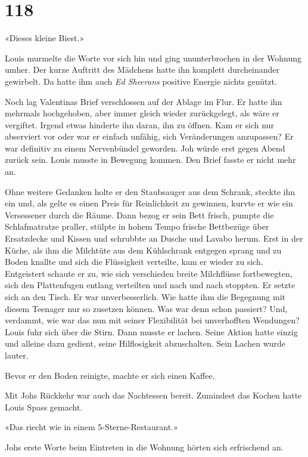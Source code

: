 \chapter{118}



«Dieses kleine Biest.»

Louis murmelte die Worte vor sich hin und ging ununterbrochen in der 
Wohnung umher. Der kurze Auftritt des Mädchens hatte ihn komplett
durcheinander gewirbelt. Da hatte ihm auch \emph{Ed Sheerans} positive
Energie nichts genützt.

Noch lag Valentinas Brief verschlossen auf der Ablage im Flur. Er hatte
ihn mehrmals hochgehoben, aber immer gleich wieder zurückgelegt, als
wäre er vergiftet. Irgend etwas hinderte ihn daran, ihn zu öffnen. Kam
er sich nur abserviert vor oder war er einfach unfähig, sich
Veränderungen anzupassen? Er war definitiv zu einem Nervenbündel
geworden.
Joh würde erst gegen Abend zurück sein.
Louis musste in Bewegung kommen. Den Brief fasste er nicht mehr an.

Ohne weitere Gedanken holte er den Staubsauger aus dem Schrank, steckte
ihn ein und, als gelte es einen Preis für Reinlichkeit zu gewinnen, kurvte er wie ein Versessener durch die Räume. Dann bezog er sein Bett
frisch, pumpte die Schlafmatratze praller, stülpte in hohem Tempo
frische Bettbezüge über Ersatzdecke und Kissen und schrubbte an Dusche
und Lavabo herum. Erst in der Küche, als ihm die Milchtüte aus dem
Kühlschrank entgegen sprang und zu Boden knallte und sich die Flüssigkeit
verteilte, kam er wieder zu sich. Entgeistert schaute er zu, wie sich
verschieden breite Milchflüsse fortbewegten, sich den Plattenfugen
entlang verteilten und nach und nach stoppten.
Er setzte sich an den Tisch. 
Er war unverbesserlich. Wie hatte ihm die Begegnung mit diesem Teenager
nur so zusetzen können. Was war denn schon passiert? Und, verdammt, wie
war das nun mit seiner Flexibilität bei unverhofften Wendungen?
Louis fuhr sich über die Stirn. Dann musste er lachen. Seine Aktion
hatte einzig und alleine dazu gedient, seine Hilflosigkeit abzuschalten.
Sein Lachen wurde lauter. 

Bevor er den Boden reinigte, machte er sich einen Kaffee.

\sectionbreak

Mit Johs Rückkehr war auch das Nachtessen bereit. Zumindest das Kochen hatte Louis
Spass gemacht.

«Das riecht wie in einem 5-Sterne-Restaurant.»

Johs erste Worte beim Eintreten in die Wohnung hörten sich erfrischend
an.

